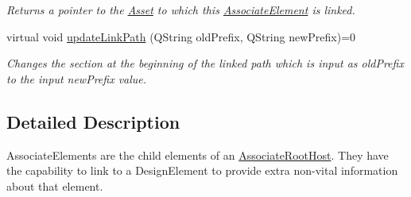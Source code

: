 \begin{DoxyCompactItemize}
\begin{DoxyCompactList}\small\item\em Returns a pointer to the \hyperlink{class_picto_1_1_asset}{Asset} to which this \hyperlink{class_picto_1_1_associate_element}{Associate\-Element} is linked. \end{DoxyCompactList}\item 
virtual void \hyperlink{class_picto_1_1_associate_element_a27017fa6d089ea68493f899d748e8b27}{update\-Link\-Path} (Q\-String old\-Prefix, Q\-String new\-Prefix)=0
\begin{DoxyCompactList}\small\item\em Changes the section at the beginning of the linked path which is input as old\-Prefix to the input new\-Prefix value. \end{DoxyCompactList}\end{DoxyCompactItemize}


\subsection{Detailed Description}
Associate\-Elements are the child elements of an \hyperlink{class_picto_1_1_associate_root_host}{Associate\-Root\-Host}. They have the capability to link to a Design\-Element to provide extra non-\/vital information about that element. 

